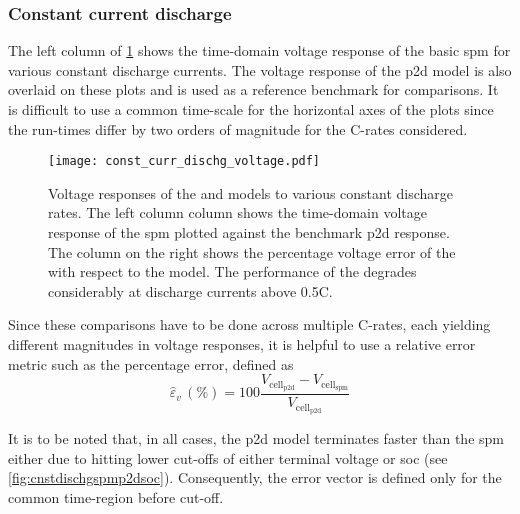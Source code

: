 \subsubsection*{Constant current discharge}\label{subsubsec:cnstcurrdischgsim}

The  left  column  of \cref{fig:cnstdischgspmp2dvoltage} shows  the  time-domain
voltage response of the basic \gls{spm} for various constant discharge currents.
The voltage response of the \gls{p2d} model  is also overlaid on these plots and
is used  as a  reference benchmark  for comparisons.  It is  difficult to  use a
common  time-scale for  the horizontal  axes of  the plots  since the  run-times
differ by two orders of magnitude for the C-rates considered.

\begin{figure}[!htbp]
    \centering
    \texttt{[image: const\_curr\_dischg\_voltage.pdf]}
    \caption[Voltage responses of  and  to
    constant current discharge]{Voltage responses of the  and
         models to various constant discharge rates. The left
        column column shows the time-domain voltage response of the \gls{spm}
        plotted against the benchmark \gls{p2d} response. The column on the
        right shows the percentage voltage error of the  with
        respect to the  model. The performance of the
         degrades considerably at discharge currents above
    0.5C.}
    \label{fig:cnstdischgspmp2dvoltage}
\end{figure}

Since these comparisons  have to be done across multiple  C-rates, each yielding
different magnitudes in voltage responses, it is helpful to use a relative error
metric such as the percentage error, defined as
\begin{equation}
    \hat{\varepsilon}_v\,(\si{\percent}) = 100\frac{V_{\text{cell}_\text{p2d}} - V_{\text{cell}_\text{spm}}}{V_{\text{cell}_\text{p2d}}}
\end{equation}

It is to be noted that, in all cases, the \gls{p2d} model terminates faster than
the \gls{spm} either due to hitting lower cut-offs of either terminal voltage or
\gls{soc} (see \cref{fig:cnstdischgspmp2dsoc}).  Consequently, the  error vector
is defined only for the common time-region before cut-off.

